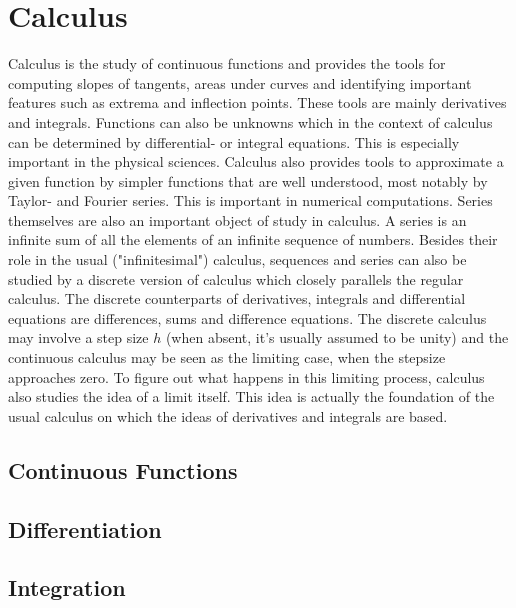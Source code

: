 \documentclass[12pt]{book}  %
\begin{document}
\chapter{Calculus}
Calculus is the study of continuous functions and provides the tools for computing slopes of tangents, areas under curves and identifying important features such as extrema and inflection points. These tools are mainly derivatives and integrals. Functions can also be unknowns which in the context of calculus can be determined by differential- or integral equations. This is especially important in the physical sciences. Calculus also provides tools to approximate a given function by simpler functions that are well understood, most notably by Taylor- and Fourier series. This is important in numerical computations. Series themselves are also an important object of study in calculus. A series is an infinite sum of all the elements of an infinite sequence of numbers. Besides their role in the usual ("infinitesimal") calculus, sequences and series can also be studied by a discrete version of calculus which closely parallels the regular calculus. The discrete counterparts of derivatives, integrals and differential equations are differences, sums and difference equations. The discrete calculus may involve a step size $h$ (when absent, it's usually assumed to be unity) and the continuous calculus may be seen as the limiting case, when the stepsize approaches zero. To figure out what happens in this limiting process, calculus also studies the idea of a limit itself. This idea is actually the foundation of the usual calculus on which the ideas of derivatives and integrals are based.
\section{Continuous Functions}
  
\section{Differentiation}
 
\section{Integration} 
  
\end{document}

